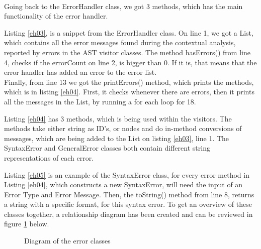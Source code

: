 \\
Going back to the ErrorHandler class, we got 3 methods, which has the main functionality of the error handler. 

\noindent\newline
Listing \ref{eh03}, is a snippet from the ErrorHandler class. On line 1, we got a List, which contains all the error messages found during the contextual analysis, reported by errors in the AST visitor classes. The method hasErrors() from line 4, checks if the errorCount on line 2, is bigger than 0. If it is, that means that the error handler has added an error to the error list.\\
Finally, from line 13 we got the printErrors() method, which prints the methods, which is in listing \ref{eh04}. First, it checks whenever there are errors, then it prints all the messages in the List, by running a for each loop for 18. 

\noindent\newline
Listing \ref{eh04} has 3 methods, which is being used within the visitors. The methods take either string as ID’s, or nodes and do in-method conversions of messages, which are being added to the List on listing \ref{eh03}, line 1. The SyntaxError and GeneralError classes both contain different string representations of each error. 

\noindent\newline
Listing \ref{eh05} is an example of the SyntaxError class, for every error method in Listing \ref{eh04}, which constructs a new SyntaxError, will need the input of an Error Type and Error Message. Then, the toString() method from line 8, returns a string with a specific format, for this syntax error. 
To get an overview of these classes together, a relationship diagram has been created and can be reviewed in figure \ref{eh06} below.
\begin{figure}[H]
\centering
{}
\caption{Diagram of the error classes}
\label{eh06}
\end{figure}